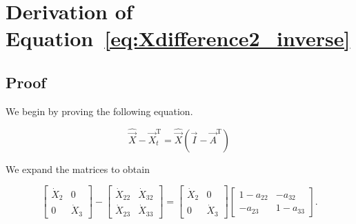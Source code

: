 %
%
%

\chapter{Derivation of Equation~\ref{eq:Xdifference2_inverse}}
\label{app:Derivation} 



\section{Proof}

We begin by proving the following equation.

\begin{equation} \label{eq:Xdifference2Proof-1}
	\hat{\vec{X}} 
	- \vec{X}_t^\mathrm{T} 
	= \hat{\vec{X}}(\vec{I} 
	- \vec{A}^\mathrm{T})
\end{equation}

\noindent{}We expand the matrices to obtain

\begin{equation} \label{eq:Xdifference2Proof-2}
	\begin{bmatrix} 	
		\dot{X}_{2} & 0	\\
		0           & \dot{X}_{3}
	\end{bmatrix}
	 -
	\begin{bmatrix} 	
		\dot{X}_{22} & \dot{X}_{32}	\\
		\dot{X}_{23} & \dot{X}_{33}
	\end{bmatrix}
	=
	\begin{bmatrix} 	
		\dot{X}_{2} & 0	\\
		0           & \dot{X}_{3}
	\end{bmatrix}
	\begin{bmatrix} 	
		1 - a_{22} & -a_{32}	\\
		-a_{23}    & 1 - a_{33}
	\end{bmatrix}.
\end{equation}

